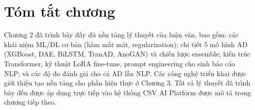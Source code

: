 \section{Tóm tắt chương}

Chương 2 đã trình bày đầy đủ nền tảng lý thuyết của luận văn, bao gồm: các khái niệm ML/DL cơ bản (hàm mất mát, regularization); chi tiết 5 mô hình AD (XGBoost, DAE, BiLSTM, TranAD, AnoGAN) và chiến lược ensemble; kiến trúc Transformer, kỹ thuật LoRA fine-tune, prompt engineering cho sinh báo cáo NLP; và các độ đo đánh giá cho cả AD lẫn NLP. Các công nghệ triển khai được giới thiệu tạo nền tảng cho phần hiện thực ở Chương 3. Tất cả lý thuyết đã trình bày đều được áp dụng trực tiếp vào hệ thống CSV AI Platform được mô tả trong chương tiếp theo.
